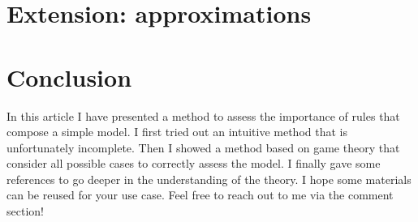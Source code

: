 \section{Extension: approximations}

\label{sec:extension-approximation}


\section{Conclusion}

\label{sec:conclusion}

In this article I have presented a method to assess the importance of rules that compose a simple model. I first tried out an intuitive method that is unfortunately incomplete. Then I showed a method based on game theory that consider all possible cases to correctly assess the model. I finally gave some references to go deeper in the understanding of the theory. I hope some materials can be reused for your use case. Feel free to reach out to me via the comment section!


\vspace{10mm}